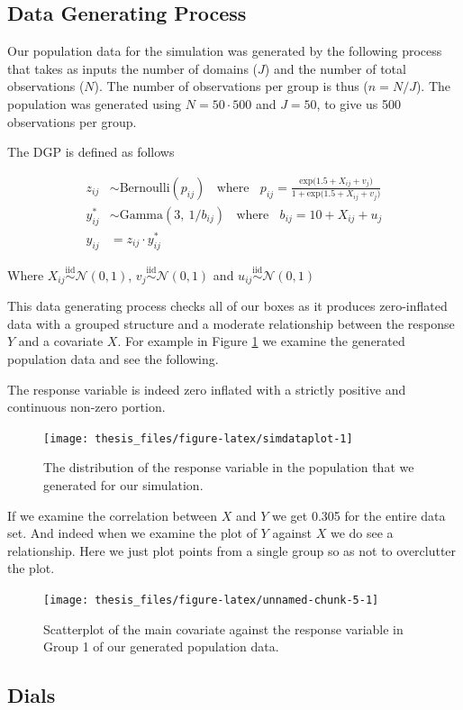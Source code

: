 \documentclass[12pt,twoside]{reedthesis}
\begin{document}
\hypertarget{data-generating-process}{%
\subsection{Data Generating Process}\label{data-generating-process}}

Our population data for the simulation was generated by the following process that takes as inputs the number of domains (\(J\)) and the number of total observations (\(N\)). The number of observations per group is thus (\(n = N/J\)). The population was generated using \(N = 50\cdot 500\) and \(J = 50\), to give us 500 observations per group.

The DGP is defined as follows

\[
\begin{aligned}
z_{ij} &\sim \text{Bernoulli}(p_{ij}) \ \ \ \ \text{where} \ \ \ \ p_{ij} = \frac{\text{exp}\big(1.5 + X_{ij} + v_j\big)}{1 + \text{exp}\big(1.5 + X_{ij} + v_j\big)} \\
y^*_{ij} &\sim \text{Gamma}(3, \  1/b_{ij}) \ \ \ \ \text{where} \ \ \ \ b_{ij} = 10 + X_{ij} + u_{j} \\
y_{ij} &=z_{ij}\cdot y^*_{ij}
\end{aligned}
\]

Where \(X_{ij} \overset{\text{iid}}{\sim} \mathcal{N}(0, 1)\), \(v_j \overset{\text{iid}}{\sim} \mathcal{N}(0, 1)\) and \(u_{ij} \overset{\text{iid}}{\sim} \mathcal{N}(0, 1)\)

This data generating process checks all of our boxes as it produces zero-inflated data with a grouped structure and a moderate relationship between the response \(Y\) and a covariate \(X\). For example in Figure \ref{fig:simdataplot} we examine the generated population data and see the following.

The response variable is indeed zero inflated with a strictly positive and continuous non-zero portion.
\begin{figure}

{\centering \texttt{[image: thesis\_files/figure-latex/simdataplot-1]} 

}

\caption{The distribution of the response variable in the population that we generated for our simulation.}\label{fig:simdataplot}
\end{figure}
If we examine the correlation between \(X\) and \(Y\) we get 0.305 for the entire data set. And indeed when we examine the plot of \(Y\) against \(X\) we do see a relationship. Here we just plot points from a single group so as not to overclutter the plot.
\begin{figure}

{\centering \texttt{[image: thesis\_files/figure-latex/unnamed-chunk-5-1]} 

}

\caption{Scatterplot of the main covariate against the response variable in Group 1 of our generated population data.}\label{fig:unnamed-chunk-5}
\end{figure}
\hypertarget{dials}{%
\subsection{Dials}\label{dials}}
\end{document}
